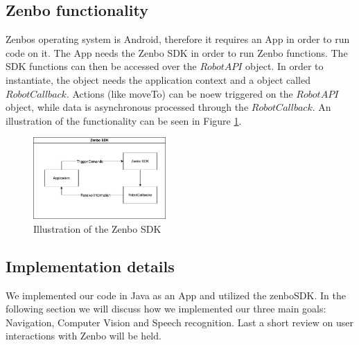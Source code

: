 \documentclass[conference]{IEEEtran}
\begin{document}
\subsection{Zenbo functionality}
Zenbos operating system is Android, therefore it requires an App in order to run code on it.
The App needs the Zenbo SDK in order to run Zenbo functions. 
The SDK functions can then be accessed over the $RobotAPI$ object. 
In order to instantiate, the object needs the application context and a object called $RobotCallback$.
Actions (like moveTo) can be noew triggered on the $RobotAPI$ object, while data is asynchronous processed 
through the $RobotCallback$. An illustration of the functionality can be seen in Figure \ref{fig:zenboSDK}. 
\begin{figure}  \label{fig:zenboSDK}
	\begin{center}
		\includegraphics[width=0.45\textwidth]{pics/zenboSDK.jpg}
	\end{center}
	\caption{Illustration of the Zenbo SDK}
\end{figure}
\subsection{Implementation details}
We implemented our code in Java as an App and utilized the zenboSDK. In the following section
we will discuss how we implemented our three main goals: Navigation, Computer Vision and Speech recognition.
Last a short review on user interactions with Zenbo will be held.\\
\end{document}
